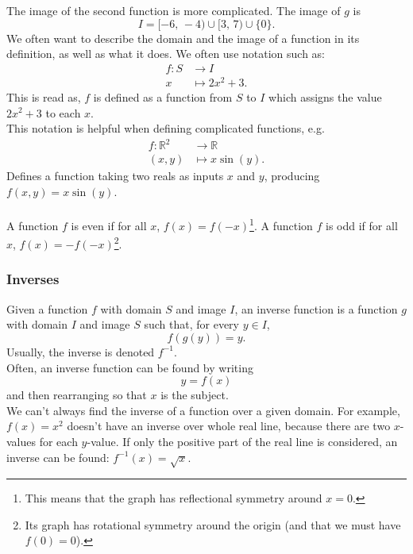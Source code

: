 \documentclass[10pt, a4paper]{article}
\newcommand{\R}{\mathbb{R}}
\begin{document}
The image of the second function is more complicated. The image of $g$ is
\[
I = [-6,\,-4) \cup [3,\,7) \cup \{0\}.
\]
We often want to describe the domain and the image of a function in its definition, as well as what it does. We often use notation such as:
\begin{align*}
f : S &\rightarrow I \\
x &\mapsto 2x ^ 2 + 3.
\end{align*}
This is read as, $f$ is defined as a function from $S$ to $I$ which assigns the value $2x ^ 2 + 3$ to each $x$. \\
This notation is helpful when defining complicated functions, e.g.
\begin{align*}
f : \R ^ 2 &\rightarrow \R \\
(x, y) &\mapsto x\sin{(y)}.
\end{align*}
Defines a function taking two reals as inputs $x$ and $y$, producing $f(x, y) = x\sin{(y)}$. \\
\\
A function $f$ is even if for all $x$, $f(x) = f(-x)$\footnote{This means that the graph has reflectional symmetry around $x = 0$.}. A function $f$ is odd if for all $x$, $f(x) = -f(-x)$\footnote{Its graph has rotational symmetry around the origin (and that we must have $f(0) = 0$).}.


\subsubsection{Inverses}
Given a function $f$ with domain $S$ and image $I$, an inverse function is a function $g$ with domain $I$ and image $S$ such that, for every $y \in I$,
\[
f(g(y)) = y.
\]
Usually, the inverse is denoted $f ^ {-1}$. \\
Often, an inverse function can be found by writing
\[
y = f(x)
\]
and then rearranging so that $x$ is the subject. \\
We can't always find the inverse of a function over a given domain. For example, $f(x) = x ^ 2$ doesn't have an inverse over whole real line, because there are two $x$-values for each $y$-value. If only the positive part of the real line is considered, an inverse can be found: $f ^ {-1}(x) = \sqrt{x}$.
\end{document}
